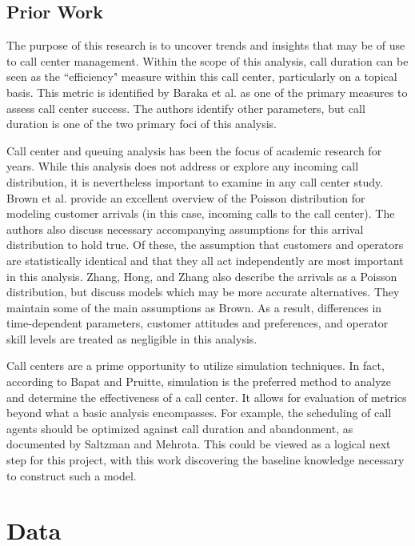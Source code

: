 \documentclass{article}
\begin{document}
	\subsection{Prior Work}

The purpose of this research is to uncover trends and insights that may be of use to call center management.  Within the scope of this analysis, call duration can be seen as the ``efficiency" measure within this call center, particularly on a topical basis.  This metric is identified by Baraka et al. as one of the primary measures to assess call center success.\cite{baraka}  The authors identify other parameters, but call duration is one of the two primary foci of this analysis.
\par
Call center and queuing analysis has been the focus of academic research for years.  While this analysis does not address or explore any incoming call distribution, it is nevertheless important to examine in any call center study.  Brown et al. provide an excellent overview of the Poisson distribution for modeling customer arrivals (in this case, incoming calls to the call center).  The authors also discuss necessary accompanying assumptions for this arrival distribution to hold true. Of these, the assumption that customers and operators are statistically identical and that they all act independently are most important in this analysis.\cite{brown}  Zhang, Hong, and Zhang also describe the arrivals as a Poisson distribution, but discuss models which may be more accurate alternatives.\cite{zhang}  They maintain some of the main assumptions as Brown.  As a result, differences in time-dependent parameters, customer attitudes and preferences, and operator skill levels are treated as negligible in this analysis.
\par
Call centers are a prime opportunity to utilize simulation techniques.  In fact, according to Bapat and Pruitte, simulation is the preferred method to analyze and determine the effectiveness of a call center.\cite{bapat}  It allows for evaluation of metrics beyond what a basic analysis encompasses.  For example, the scheduling of call agents should be optimized against call duration and abandonment, as documented by Saltzman and Mehrota.\cite{saltzman}  This could be viewed as a logical next step for this project, with this work discovering the baseline knowledge necessary to construct such a model.


\section{Data}
\end{document}
